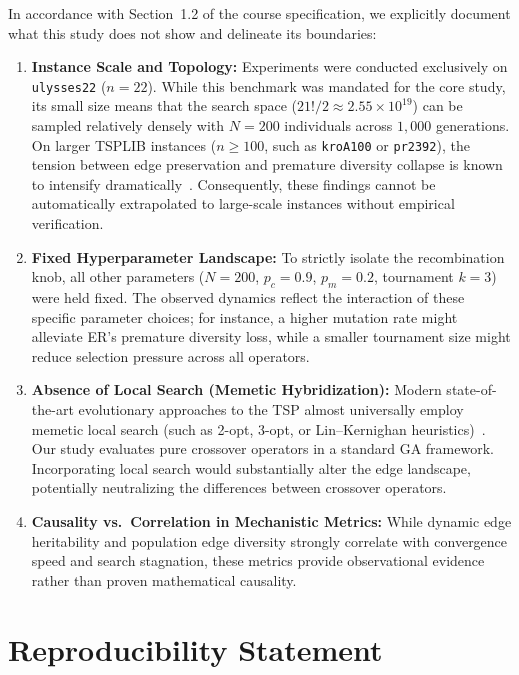 \documentclass[10pt,a4paper]{article}
\begin{document}
In accordance with Section~1.2 of the course specification, we explicitly document what this study does not show and delineate its boundaries:
\begin{enumerate}
    \item \textbf{Instance Scale and Topology:} Experiments were conducted exclusively on \texttt{ulysses22} ($n=22$). While this benchmark was mandated for the core study, its small size means that the search space ($21! / 2 \approx 2.55 \times 10^{19}$) can be sampled relatively densely with $N=200$ individuals across $1{,}000$ generations. On larger TSPLIB instances ($n \ge 100$, such as \texttt{kroA100} or \texttt{pr2392}), the tension between edge preservation and premature diversity collapse is known to intensify dramatically~\cite{larranaga1999genetic,whitley1989scheduling}. Consequently, these findings cannot be automatically extrapolated to large-scale instances without empirical verification.
    \item \textbf{Fixed Hyperparameter Landscape:} To strictly isolate the recombination knob, all other parameters ($N=200$, $p_c=0.9$, $p_m=0.2$, tournament $k=3$) were held fixed. The observed dynamics reflect the interaction of these specific parameter choices; for instance, a higher mutation rate might alleviate ER's premature diversity loss, while a smaller tournament size might reduce selection pressure across all operators.
    \item \textbf{Absence of Local Search (Memetic Hybridization):} Modern state-of-the-art evolutionary approaches to the TSP almost universally employ memetic local search (such as 2-opt, 3-opt, or Lin--Kernighan heuristics)~\cite{larranaga1999genetic}. Our study evaluates pure crossover operators in a standard GA framework. Incorporating local search would substantially alter the edge landscape, potentially neutralizing the differences between crossover operators.
    \item \textbf{Causality vs.~Correlation in Mechanistic Metrics:} While dynamic edge heritability and population edge diversity strongly correlate with convergence speed and search stagnation, these metrics provide observational evidence rather than proven mathematical causality.
\end{enumerate}

\section{Reproducibility Statement}
\label{sec:reproducibility}
\end{document}
